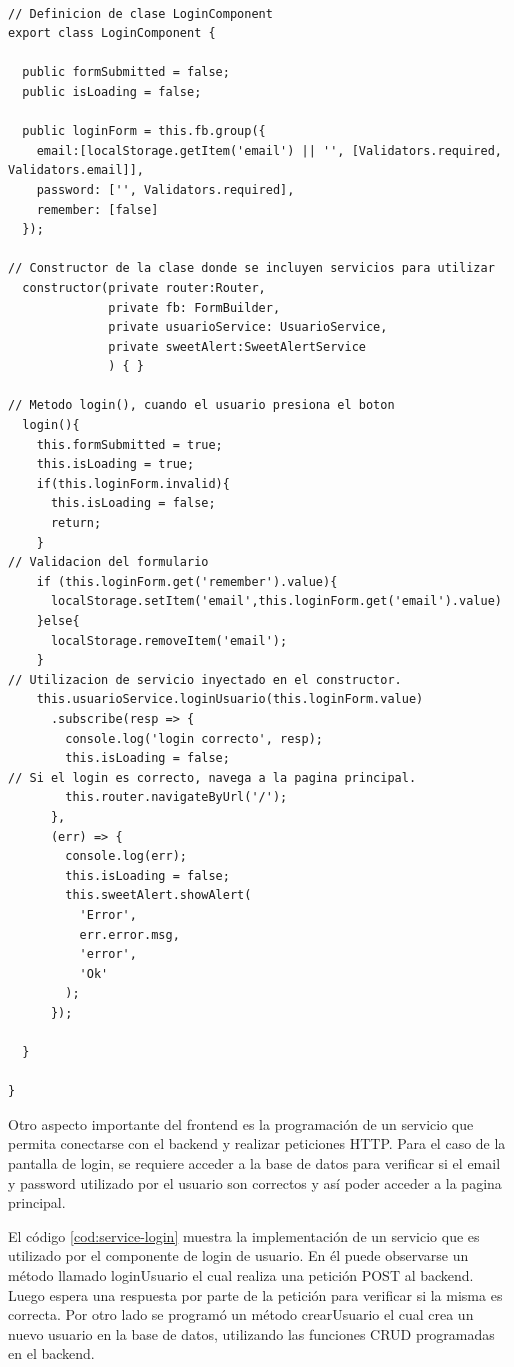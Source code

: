 \begin{lstlisting}[label=cod:ts-login,caption=Fragmentos de código mas relevantes utilizado en el archivo \textit{Typescript} del componente login.] 

// Definicion de clase LoginComponent
export class LoginComponent {

  public formSubmitted = false;
  public isLoading = false;

  public loginForm = this.fb.group({  
    email:[localStorage.getItem('email') || '', [Validators.required, Validators.email]],
    password: ['', Validators.required],
    remember: [false]
  });

// Constructor de la clase donde se incluyen servicios para utilizar
  constructor(private router:Router,
              private fb: FormBuilder,
              private usuarioService: UsuarioService,
              private sweetAlert:SweetAlertService
              ) { }
              
// Metodo login(), cuando el usuario presiona el boton
  login(){
    this.formSubmitted = true;
    this.isLoading = true;
    if(this.loginForm.invalid){
      this.isLoading = false;
      return;
    }
// Validacion del formulario 
    if (this.loginForm.get('remember').value){
      localStorage.setItem('email',this.loginForm.get('email').value)
    }else{
      localStorage.removeItem('email');
    }
// Utilizacion de servicio inyectado en el constructor.
    this.usuarioService.loginUsuario(this.loginForm.value)
      .subscribe(resp => {
        console.log('login correcto', resp);
        this.isLoading = false;
// Si el login es correcto, navega a la pagina principal. 
        this.router.navigateByUrl('/');
      },
      (err) => {
        console.log(err);
        this.isLoading = false;
        this.sweetAlert.showAlert(
          'Error',
          err.error.msg,
          'error',
          'Ok'
        );
      });
    
  }

}
\end{lstlisting} 

Otro aspecto importante del frontend es la programación de un servicio que permita conectarse con el backend y realizar peticiones HTTP. Para el caso de la pantalla de login,  se requiere acceder a la base de datos para verificar si el email y password utilizado por el usuario son correctos y así poder acceder a la pagina principal. 

El código \ref{cod:service-login} muestra la implementación de un servicio que es utilizado por el componente de login de usuario. En él puede observarse un método llamado loginUsuario el cual realiza una petición POST al backend.  Luego espera una respuesta por parte de la petición para verificar si la misma es correcta.  Por otro lado se programó un método crearUsuario el cual crea un nuevo usuario en la base de datos, utilizando las funciones CRUD programadas en el backend. 

